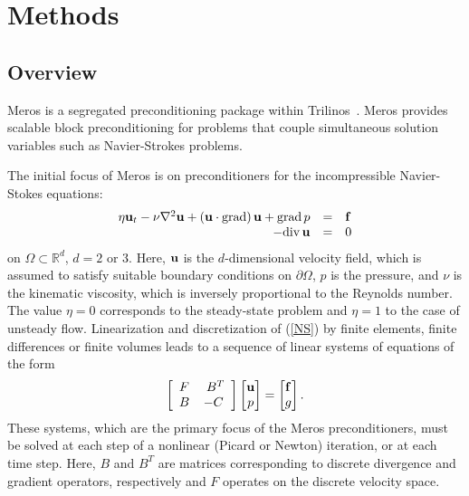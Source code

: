 \section{Methods}
\label{index_methods}
\subsection{Overview}
Meros is a segregated preconditioning package within
Trilinos~\cite{Trilinos-Overview}.  Meros
provides scalable block preconditioning for problems that couple
simultaneous solution variables such as Navier-Strokes problems.

The initial focus of Meros is on preconditioners for the
incompressible Navier-Stokes equations:
\begin{equation} \label{NS}
  \begin{array}{rcl}
    \eta {\bf u}_t -\nu \nabla^2 {\bf u}
    + ({\bf u} \cdot {\rm grad})\, {\bf u} +
    {\rm grad}\, p &= &{\bf f} \\
    -{\rm div}\, {\bf u} &= &0
  \end{array}
\end{equation}
on $\Omega \subset \mathbb{R}^d$, $d=2$ or $3$.  Here, ${\bf u}$
is the $d$-dimensional velocity field, which is assumed to satisfy
suitable boundary conditions on $\partial \Omega$, $p$ is the
pressure, and $\nu$ is the kinematic viscosity, which is
inversely proportional to the Reynolds number.  
The value $\eta=0$ corresponds to the steady-state problem and $\eta=1$
to the  case of unsteady flow. 
Linearization and discretization of (\ref{NS}) by finite elements, finite 
differences or finite volumes leads to a sequence of linear systems of 
equations of the form
\begin{equation} \label{NSdiscretelinearStabilized}
\left[  
  \begin{array}{lc}
    F  & \ B^T   \\ B  & -C
  \end{array}
 \right]
  \begin{bmatrix}
    {\bf u}\\ p
  \end{bmatrix}
  =
  \begin{bmatrix}
    {\bf f}\\ g
  \end{bmatrix}.
\end{equation}
These systems, which are the primary focus of the Meros
preconditioners, must be solved 
at each step of a nonlinear (Picard or Newton) iteration, or at
each time step.   Here, $B$ and $B^T$ are matrices corresponding
to discrete divergence and gradient operators, respectively and
$F$ operates on the discrete velocity space. 

